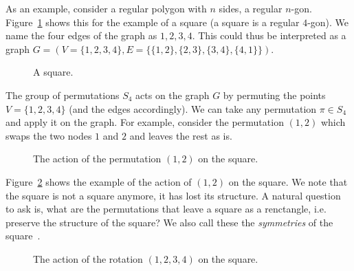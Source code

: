 As an example, consider a regular polygon with $n$ sides, a regular $n$-gon.
Figure~\ref{fig:square} shows this for the example of a square (a square is a regular $4$-gon).
We name the four edges of the graph as $1,2,3,4$.
This could thus be interpreted as a graph $G = (V = \{1,2,3,4\}, E = \{ \{1,2\}, \{2,3\},\{3,4\},\{4,1\} \})$.

\begin{figure}[h]
	\centering
\resizebox{0.3\textwidth}{!}{
   \begin{tikzpicture}
     
   \end{tikzpicture}
 }
   \caption{A square.}
   \label{fig:square}
\end{figure}

The group of permutations $S_4$ acts on the graph $G$ by permuting the points $V = \{1,2,3,4\}$ (and the edges accordingly).
We can take any permutation $\pi \in S_4$ and apply it on the graph.
For example, consider the permutation $(1,2)$ which swaps the two nodes $1$ and $2$ and leaves the rest as is.

\begin{figure}[h]
	\centering
\resizebox{0.3\textwidth}{!}{
   \begin{tikzpicture}
     
   \end{tikzpicture}
 }
   \caption{The action of the permutation $(1,2)$ on the square.}
   \label{fig:square_permutation_wrong}
\end{figure}

Figure~\ref{fig:square_permutation_wrong} shows the example of the action of $(1,2)$ on the square.
We note that the square is not a square anymore, it has lost its structure.
A natural question to ask is, what are the permutations that leave a square as a renctangle, i.e. preserve the structure of the square?
We also call these the \emph{symmetries} of the square~.

\begin{figure}[h]
	\centering
\resizebox{0.3\textwidth}{!}{
   \begin{tikzpicture}
     
   \end{tikzpicture}
 }
   \caption{The action of the rotation $(1,2,3,4)$ on the square.}
   \label{fig:square_rotation}
\end{figure}

